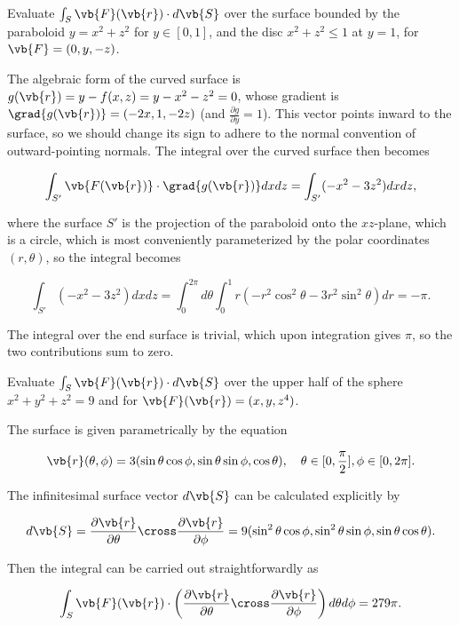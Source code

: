 \documentclass[english,a4paper,12pt]{report}
\begin{document}
{Evaluate \(\int_{S}^{}   \vb{F} (\vb{r} )\cdot d\vb{S} \) over the surface bounded by the paraboloid \(y = x^2+z^2\) for \(y \in [0,1]\), and the disc \(x^2+z^2 \le 1\) at \(y=1\), for \(\vb{F} = (0,y,-z)\).}
{The algebraic form of the curved surface is \(g(\vb{r}) = y - f(x,z) = y - x^2 - z^2 = 0\), whose gradient is \(\grad{g(\vb{r})} = (-2x,1,-2z) \) (and \(\frac{\partial g}{\partial y} = 1\)). This vector points inward to the surface, so we should change its sign to adhere to the normal convention of outward-pointing normals. The integral over the curved surface then becomes

\begin{equation}
	\int_{S'}^{}   \vb{F(\vb{r} )} \cdot \grad{g(\vb{r})} dxdz = \int_{S'}^{} (-x^2-3z^2)dxdz,
\end{equation}

where the surface \(S'\) is the projection of the paraboloid onto the \(xz\)-plane, which is a circle, which is most conveniently parameterized by the polar coordinates \((r,\theta )\), so the integral becomes

\begin{equation}
	\int_{S'}^{} (-x^2-3z^2)dxdz = \int_{0}^{2\pi } d \theta \int_{0}^{1} r(-r^2\cos ^2\theta - 3r^2\sin ^2\theta )dr = -\pi .   
\end{equation}

The integral over the end surface is trivial, which upon integration gives \(\pi \), so the two contributions sum to zero. 

} 

{Evaluate \(\int_{S}^{} \vb{F} (\vb{r} ) \cdot d\vb{S}  \) over the upper half of the sphere \(x^2+y^2+z^2 = 9\) and for \(\vb{F} (\vb{r} ) = (x,y,z^4)\).}
{The surface is given parametrically by the equation 

\begin{equation}
	\vb{r} (\theta , \phi ) = 3(\sin \theta \cos \phi , \sin \theta \sin \phi , \cos \theta ), \quad \theta \in [0,\frac{\pi }{2} ], \phi \in [0, 2\pi ].
\end{equation}

The infinitesimal surface vector \(d\vb{S} \) can be calculated explicitly by 

\begin{equation}
	d\vb{S} = \frac{\partial \vb{r} }{\partial \theta } \cross \frac{\partial \vb{r} }{\partial \phi } = 9(\sin ^2\theta \cos \phi , \sin ^2\theta \sin \phi , \sin \theta \cos \theta ).   
\end{equation}

Then the integral can be carried out straightforwardly as

\begin{equation}
	\int_{S}^{} \vb{F} (\vb{r} ) \cdot \left( \frac{\partial \vb{r} }{\partial \theta } \cross \frac{\partial \vb{r} }{\partial \phi }   \right) d \theta d\phi = 279\pi .  
\end{equation}

} 
\end{document}
